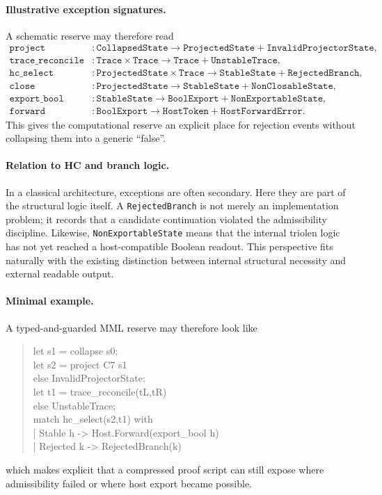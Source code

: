 \paragraph{Illustrative exception signatures.}
A schematic reserve may therefore read
\begin{align*}
\texttt{project} &: \texttt{CollapsedState} \to \texttt{ProjectedState} + \texttt{InvalidProjectorState},\\
\texttt{trace\_reconcile} &: \texttt{Trace} \times \texttt{Trace} \to \texttt{Trace} + \texttt{UnstableTrace},\\
\texttt{hc\_select} &: \texttt{ProjectedState} \times \texttt{Trace} \to \texttt{StableState} + \texttt{RejectedBranch},\\
\texttt{close} &: \texttt{ProjectedState} \to \texttt{StableState} + \texttt{NonClosableState},\\
\texttt{export\_bool} &: \texttt{StableState} \to \texttt{BoolExport} + \texttt{NonExportableState},\\
\texttt{forward} &: \texttt{BoolExport} \to \texttt{HostToken} + \texttt{HostForwardError}.
\end{align*}
This gives the computational reserve an explicit place for rejection events without collapsing them into a generic ``false''.

\paragraph{Relation to HC and branch logic.}
In a classical architecture, exceptions are often secondary. Here they are part of the structural logic itself. A \texttt{RejectedBranch} is not merely an implementation problem; it records that a candidate continuation violated the admissibility discipline. Likewise, \texttt{NonExportableState} means that the internal triolen logic has not yet reached a host-compatible Boolean readout. This perspective fits naturally with the existing distinction between internal structural necessity and external readable output.

\paragraph{Minimal example.}
A typed-and-guarded MML reserve may therefore look like
\begin{quote}
\ttfamily
let s1 = collapse s0;\\
let s2 = project C7 s1\\
\quad else InvalidProjectorState;\\
let t1 = trace\_reconcile(tL,tR)\\
\quad else UnstableTrace;\\
match hc\_select(s2,t1) with\\
| Stable h      -> Host.Forward(export\_bool h)\\
| Rejected k    -> RejectedBranch(k)
\end{quote}
which makes explicit that a compressed proof script can still expose where admissibility failed or where host export became possible.

